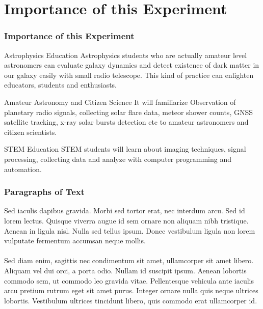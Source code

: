 \documentclass{beamer}
\begin{document}


\section{Importance of this Experiment}


\begin{frame}
\frametitle{Importance of this Experiment}
\begin{block}{Astrophysics Education}
Astrophysics students who are actually amateur level astronomers can evaluate galaxy dynamics and detect existence of dark matter in our galaxy easily with small radio telescope. This kind of practice can enlighten educators, students and enthusiasts.
\end{block}

\begin{block}{Amateur Astronomy and Citizen Science}
It will familiarize Observation of planetary radio signals, collecting solar flare data, meteor shower counts, GNSS satellite tracking, x-ray solar bursts detection etc to amateur astronomers and citizen scientists.
\end{block}

\begin{block}{STEM Education}
STEM students will learn about imaging techniques, signal processing, collecting data and analyze with computer programming and automation.
\end{block}
\end{frame}




\begin{frame}
\frametitle{Paragraphs of Text}
Sed iaculis dapibus gravida. Morbi sed tortor erat, nec interdum arcu. Sed id lorem lectus. Quisque viverra augue id sem ornare non aliquam nibh tristique. Aenean in ligula nisl. Nulla sed tellus ipsum. Donec vestibulum ligula non lorem vulputate fermentum accumsan neque mollis.\\~\\

Sed diam enim, sagittis nec condimentum sit amet, ullamcorper sit amet libero. Aliquam vel dui orci, a porta odio. Nullam id suscipit ipsum. Aenean lobortis commodo sem, ut commodo leo gravida vitae. Pellentesque vehicula ante iaculis arcu pretium rutrum eget sit amet purus. Integer ornare nulla quis neque ultrices lobortis. Vestibulum ultrices tincidunt libero, quis commodo erat ullamcorper id.
\end{frame}
\end{document}

